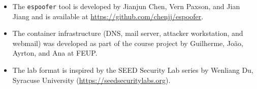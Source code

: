 \documentclass[11pt]{article}
\begin{document}
\begin{itemize}[noitemsep]
  \item The \texttt{espoofer} tool is developed by Jianjun Chen, Vern
        Paxson, and Jian Jiang and is available at
        \url{https://github.com/chenjj/espoofer}.
  \item The container infrastructure (DNS, mail server, attacker
        workstation, and webmail) was developed as part of the
        course project by Guilherme, Jo\~ao, Ayrton, and Ana at FEUP.
  \item The lab format is inspired by the SEED Security Lab series by
        Wenliang Du, Syracuse University
        (\url{https://seedsecuritylabs.org}).
\end{itemize}
\end{document}
